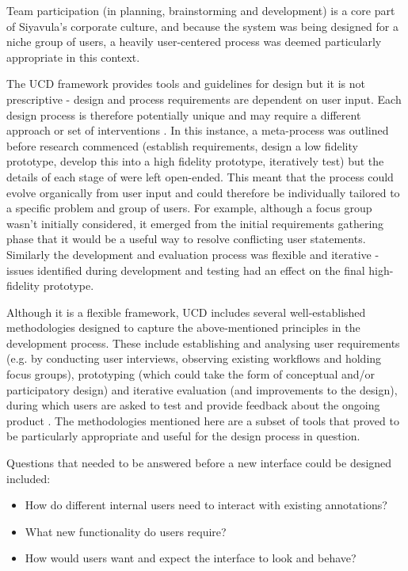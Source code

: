 Team participation (in planning, brainstorming and development) is a core part of Siyavula's corporate culture, and because the system was being designed for a niche group of users, a heavily user-centered process was deemed particularly appropriate in this context.

The UCD framework provides tools and guidelines for design but it is not prescriptive - design and process requirements are dependent on user input. Each design process is therefore potentially unique and may require a different approach or set of interventions \citep[p. 332]{RogersPreece}. In this instance, a meta-process was outlined before research commenced (establish requirements, design a low fidelity prototype, develop this into a high fidelity prototype, iteratively test) but the details of each stage of were left open-ended. This meant that the process could evolve organically from user input and could therefore be individually tailored to a specific problem and group of users. For example, although a focus group wasn't initially considered, it emerged from the initial requirements gathering phase that it would be a useful way to resolve conflicting user statements. Similarly the development and evaluation process was flexible and iterative - issues identified during development and testing had an effect on the final high-fidelity prototype. 

Although it is a flexible framework, UCD includes several well-established methodologies designed to capture the above-mentioned principles in the development process. These include establishing and analysing user requirements (e.g. by conducting user interviews, observing existing workflows and holding focus groups), prototyping (which could take the form of conceptual and/or participatory design) and iterative evaluation (and improvements to the design), during which users are asked to test and provide feedback about the ongoing product \citep[p. 330 - 331]{RogersPreece}. The methodologies mentioned here are a subset of tools that proved to be particularly appropriate and useful for the design process in question.

Questions that needed to be answered before a new interface could be designed included: 
\begin{itemize}
 \item How do different internal users need to interact with existing annotations? 
 \item What new functionality do users require? 
 \item How would users want and expect the interface to look and behave?
\end{itemize}

